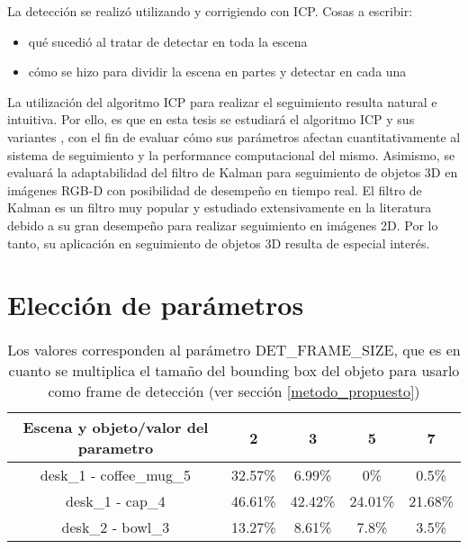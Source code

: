 La detección se realizó utilizando \cite{6630856} y corrigiendo con ICP.
Cosas a escribir:
\begin{itemize}
	\item qué sucedió al tratar de detectar en toda la escena
	\item cómo se hizo para dividir la escena en partes y detectar en cada una
\end{itemize}


La utilización del algoritmo ICP \cite{zhang94icp,besl92icp} para realizar el seguimiento resulta natural e intuitiva. Por ello, es que en esta tesis se estudiará el algoritmo ICP y sus variantes \cite{estepar2004robust,segal2009generalized}, con el fin de evaluar cómo sus parámetros afectan cuantitativamente al sistema de seguimiento y la performance computacional del mismo. Asimismo, se evaluará la adaptabilidad del filtro de Kalman \cite{welch1995introduction} para seguimiento de objetos 3D en imágenes RGB-D con posibilidad de desempeño en tiempo real. El filtro de Kalman es un filtro muy popular y estudiado extensivamente en la literatura \cite{julier1997new,wan2000unscented} debido a su gran desempeño para realizar seguimiento en imágenes 2D. Por lo tanto, su aplicación en seguimiento de objetos 3D resulta de especial interés.

\section{Elección de parámetros}
\begin{table}[h]
	\begin{tabular}{|c|c|c|c|c|}
	\hline 
	Escena y objeto/valor del parametro & 2 & 3 & 5 & 7 \\ 
	\hline 
	desk\_1 - coffee\_mug\_5 & 32.57\% & 6.99\% & 0\% & 0.5\% \\ 
	\hline 
	desk\_1 - cap\_4 & 46.61\% & 42.42\% & 24.01\% & 21.68\% \\ 
	\hline 
	desk\_2 - bowl\_3 & 13.27\% & 8.61\% & 7.8\% & 3.5\% \\ 
	\hline 
	\end{tabular}
	\caption{Los valores corresponden al parámetro DET\_FRAME\_SIZE, que es en cuanto se multiplica el tamaño del bounding box del objeto para usarlo como frame de detección (ver sección \ref{metodo_propuesto})}
\end{table}



